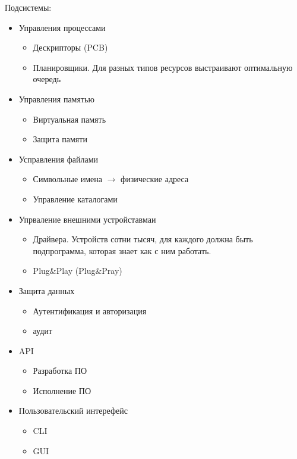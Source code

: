 \documentclass{book}
\theoremstyle{definition}
\begin{document}
    Подсистемы:
    \begin{itemize}
        \item Управления процессами
            \begin{itemize}
                \item Дескрипторы (PCB)
                \item Планировщики. Для разных типов ресурсов выстраивают оптимальную очередь
            \end{itemize}

        \item Управления памятью
            \begin{itemize}
                \item Виртуальная память
                \item Защита памяти
            \end{itemize}
        \item Усправления файлами
            \begin{itemize}
                \item Символьные имена $\to $ физические адреса
                \item Управление каталогами
            \end{itemize}
        \item Упрваление внешними устройставмаи
            \begin{itemize}
                \item Драйвера. Устройств сотни тысяч, для каждого должна быть подпрограмма,  которая знает как с ним работать.

                   \item Plug\&Play (Plug\&Pray)
            \end{itemize}
        \item Защита данных
            \begin{itemize}
                \item  Аутентификация и авторизация
                \item аудит
            \end{itemize}
        \item API
            \begin{itemize}
                \item Разработка ПО
                \item Исполнение ПО
            \end{itemize}
        \item Пользовательский интерефейс
            \begin{itemize}
                \item CLI
                \item GUI
            \end{itemize}
    \end{itemize}
\end{document}
